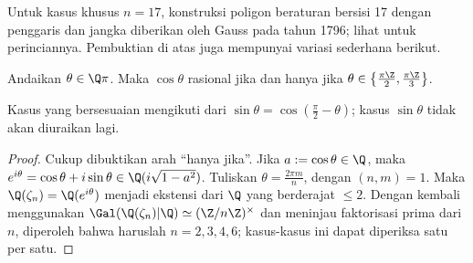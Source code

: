 Untuk kasus khusus $n = 17$, konstruksi poligon beraturan bersisi 17 dengan penggaris dan jangka diberikan oleh Gauss pada tahun 1796; lihat \cite[\S 29]{Har00} untuk perinciannya. Pembuktian di atas juga mempunyai variasi sederhana berikut.
\begin{proposition}\label{prop:cos-rationality}
	Andaikan $\theta \in \Q\pi$. Maka $\cos\theta$ rasional jika dan hanya jika $\theta \in \left\{ \frac{\pi\Z}{2}, \frac{\pi\Z}{3} \right\}$.
\end{proposition}
Kasus yang bersesuaian mengikuti dari $\sin\theta = \cos(\frac{\pi}{2} - \theta)$; kasus $\sin\theta$ tidak akan diuraikan lagi.
\begin{proof}
	Cukup dibuktikan arah ``hanya jika''. Jika $a := \cos\theta \in \Q$, maka $e^{i\theta} = \cos\theta + i\sin\theta \in \Q(i \sqrt{1 - a^2})$. Tuliskan $\theta = \frac{2\pi m}{n}$, dengan $(n,m)=1$. Maka $\Q(\zeta_n) = \Q(e^{i\theta})$ menjadi ekstensi dari $\Q$ yang berderajat $\leq 2$. Dengan kembali menggunakan $\Gal(\Q(\zeta_n)|\Q) \simeq (\Z/n\Z)^\times$ dan meninjau faktorisasi prima dari $n$, diperoleh bahwa haruslah $n=2,3,4,6$; kasus-kasus ini dapat diperiksa satu per satu.
\end{proof}

